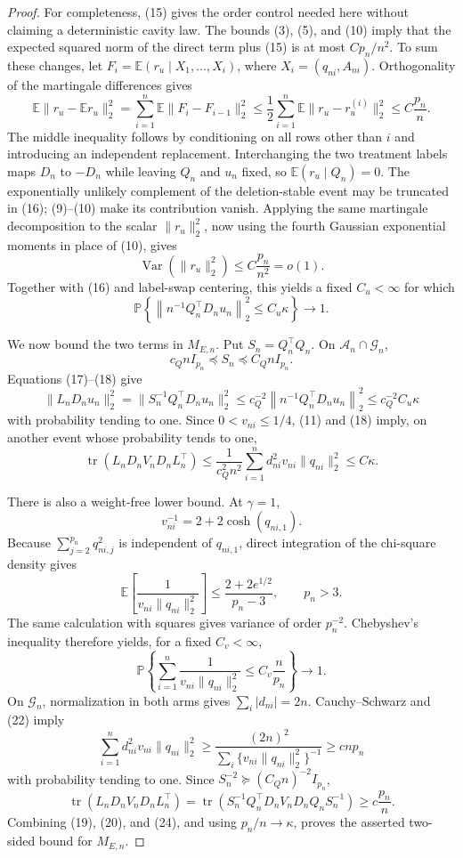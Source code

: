 \documentclass{article}
\begin{document}
\begin{proof}
For completeness, (15) gives the order control needed here without claiming a deterministic cavity law.  The bounds (3), (5), and (10) imply that the expected squared norm of the direct term plus (15) is at most \(Cp_n/n^2\).  To sum these changes, let \(F_i=\mathbb E(r_u\mid X_1,\ldots,X_i)\), where \(X_i=(q_{ni},A_{ni})\).  Orthogonality of the martingale differences gives
\[
 \mathbb E\|r_u-\mathbb Er_u\|_2^2
 =\sum_{i=1}^n\mathbb E\|F_i-F_{i-1}\|_2^2
 \le \frac12\sum_{i=1}^n
 \mathbb E\|r_u-r_u^{(i)}\|_2^2
 \le C\frac{p_n}{n}.
 \tag{16}
\]
The middle inequality follows by conditioning on all rows other than \(i\) and introducing an independent replacement.  Interchanging the two treatment labels maps \(D_n\) to \(-D_n\) while leaving \(Q_n\) and \(u_n\) fixed, so \(\mathbb E(r_u\mid Q_n)=0\).  The exponentially unlikely complement of the deletion-stable event may be truncated in (16); (9)--(10) make its contribution vanish.  Applying the same martingale decomposition to the scalar \(\|r_u\|_2^2\), now using the fourth Gaussian exponential moments in place of (10), gives
\[
 \operatorname{Var}(\|r_u\|_2^2)\le C\frac{p_n}{n^2}=o(1).
\]
Together with (16) and label-swap centering, this yields a fixed \(C_u<\infty\) for which
\[
 \mathbb P\!\left\{
 \left\|n^{-1}Q_n^{\top}D_nu_n\right\|_2^2\le C_u\kappa
 \right\}\longrightarrow1.
 \tag{17}
\]

We now bound the two terms in \(M_{E,n}\).  Put \(S_n=Q_n^{\top}Q_n\).  On \(\mathcal A_n\cap\mathcal G_n\),
\[
 c_QnI_{p_n}\preceq S_n\preceq C_QnI_{p_n}.
 \tag{18}
\]
Equations (17)--(18) give
\[
 \|L_nD_nu_n\|_2^2
 =\|S_n^{-1}Q_n^{\top}D_nu_n\|_2^2
 \le c_Q^{-2}\left\|n^{-1}Q_n^{\top}D_nu_n\right\|_2^2
 \le c_Q^{-2}C_u\kappa
 \tag{19}
\]
with probability tending to one.  Since \(0<v_{ni}\le1/4\), (11) and (18) imply, on another event whose probability tends to one,
\[
 \operatorname{tr}(L_nD_nV_nD_nL_n^{\top})
 \le \frac{1}{c_Q^2n^2}
 \sum_{i=1}^nd_{ni}^2v_{ni}\|q_{ni}\|_2^2
 \le C\kappa.
 \tag{20}
\]

There is also a weight-free lower bound.  At \(\gamma=1\),
\[
 v_{ni}^{-1}=2+2\cosh(q_{ni,1}).
\]
Because \(\sum_{j=2}^{p_n}q_{ni,j}^2\) is independent of \(q_{ni,1}\), direct integration of the chi-square density gives
\[
 \mathbb E\!\left[\frac1{v_{ni}\|q_{ni}\|_2^2}\right]
 \le \frac{2+2e^{1/2}}{p_n-3},
 \qquad p_n>3.
 \tag{21}
\]
The same calculation with squares gives variance of order \(p_n^{-2}\).  Chebyshev's inequality therefore yields, for a fixed \(C_v<\infty\),
\[
 \mathbb P\!\left\{
 \sum_{i=1}^n\frac1{v_{ni}\|q_{ni}\|_2^2}
 \le C_v\frac{n}{p_n}
 \right\}\longrightarrow1.
 \tag{22}
\]
On \(\mathcal G_n\), normalization in both arms gives \(\sum_i|d_{ni}|=2n\).  Cauchy--Schwarz and (22) imply
\[
 \sum_{i=1}^nd_{ni}^2v_{ni}\|q_{ni}\|_2^2
 \ge
 \frac{(2n)^2}{\sum_i\{v_{ni}\|q_{ni}\|_2^2\}^{-1}}
 \ge cnp_n
 \tag{23}
\]
with probability tending to one.  Since \(S_n^{-2}\succeq(C_Qn)^{-2}I_{p_n}\),
\[
 \operatorname{tr}(L_nD_nV_nD_nL_n^{\top})
 =\operatorname{tr}\!\left(S_n^{-1}Q_n^{\top}D_nV_nD_nQ_nS_n^{-1}\right)
 \ge c\frac{p_n}{n}.
 \tag{24}
\]
Combining (19), (20), and (24), and using \(p_n/n\to\kappa\), proves the asserted two-sided bound for \(M_{E,n}\).


\end{proof}
\end{document}
